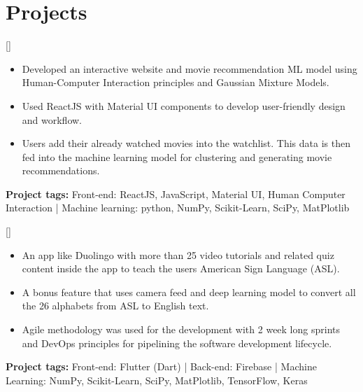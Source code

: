 \documentclass{article}
\begin{document}


 
\section{Projects}


[]
\begin{itemize}
\item Developed an interactive website and movie recommendation ML model using Human-Computer Interaction principles and Gaussian Mixture Models. 
\item Used ReactJS with Material UI components to develop user-friendly design and workflow.
\item Users add their already watched movies into the watchlist. This data is then fed into the machine learning model for clustering and generating movie recommendations.
\end{itemize}
\textbf{Project tags:} 
Front-end: ReactJS, JavaScript, Material UI, Human Computer Interaction | Machine learning: python, NumPy, Scikit-Learn, SciPy, MatPlotlib 

[]
\begin{itemize}
\item An app like Duolingo with more than 25 video tutorials and related quiz content inside the app to teach the users American Sign Language (ASL).
\item A bonus feature that uses camera feed and deep learning model to convert all the 26 alphabets from ASL to English text.
\item Agile methodology was used for the development with 2 week long sprints and DevOps principles for pipelining the software development lifecycle.
\end{itemize}
\textbf{Project tags:} 
Front-end: Flutter (Dart) | Back-end: Firebase | Machine Learning: NumPy, Scikit-Learn, SciPy, MatPlotlib, TensorFlow, Keras
\end{document}
